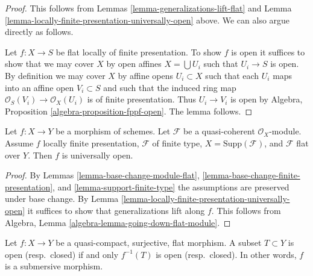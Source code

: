 \begin{proof}
This follows from Lemmas \ref{lemma-generalizations-lift-flat} and
Lemma \ref{lemma-locally-finite-presentation-universally-open} above.
We can also argue directly as follows.

\medskip\noindent
Let $f : X \to S$ be flat locally of finite presentation.
To show $f$ is open it suffices to show that we may cover
$X$ by open affines $X = \bigcup U_i$ such that $U_i \to S$
is open. By definition we may cover $X$ by
affine opens $U_i \subset X$ such that each $U_i$ maps
into an affine open $V_i \subset S$ and such that
the induced ring map $\mathcal{O}_S(V_i) \to \mathcal{O}_X(U_i)$ is
of finite presentation. Thus $U_i \to V_i$ is open by
Algebra, Proposition \ref{algebra-proposition-fppf-open}.
The lemma follows.
\end{proof}

\begin{lemma}
\label{lemma-pf-flat-module-open}
Let $f : X \to Y$ be a morphism of schemes.
Let $\mathcal{F}$ be a quasi-coherent $\mathcal{O}_X$-module.
Assume $f$ locally finite presentation, $\mathcal{F}$ of
finite type, $X = \text{Supp}(\mathcal{F})$, and
$\mathcal{F}$ flat over $Y$. Then $f$ is universally open.
\end{lemma}

\begin{proof}
By Lemmas \ref{lemma-base-change-module-flat},
\ref{lemma-base-change-finite-presentation}, and
\ref{lemma-support-finite-type}
the assumptions are preserved under base change.
By Lemma \ref{lemma-locally-finite-presentation-universally-open}
it suffices to show that generalizations lift along $f$.
This follows from Algebra, Lemma \ref{algebra-lemma-going-down-flat-module}.
\end{proof}

\begin{lemma}
\label{lemma-fpqc-quotient-topology}
Let $f : X \to Y$ be a quasi-compact, surjective, flat morphism.
A subset $T \subset Y$ is open (resp.\ closed) if and only
$f^{-1}(T)$ is open (resp.\ closed). In other words, $f$ is
a submersive morphism.
\end{lemma}

